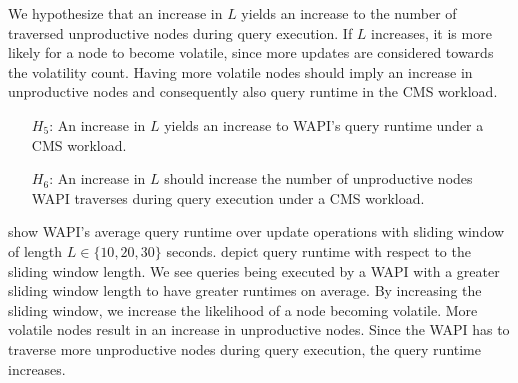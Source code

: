 \documentclass[abstracton,12pt]{scrartcl}
\theoremstyle{definition}
\begin{document}
We hypothesize that an increase in $L$ yields an increase to the number of
traversed unproductive nodes during query execution. If $L$ increases, it is
more likely for a node to become volatile, since more updates are considered
towards the volatility count.
Having more volatile nodes should imply an increase in unproductive nodes and
consequently also query runtime in the CMS workload.

\begin{shaded}
  \begin{itemize}
  \item[$H_5$:] An increase in $L$ yields an increase to WAPI's query runtime
    under a CMS workload. 
  \item[$H_6$:] An increase in $L$ should increase the number of unproductive
    nodes WAPI traverses during query execution under a CMS workload.
  \end{itemize}
\end{shaded}


 show WAPI's average
query runtime over update operations with sliding window of length $L \in \{10, 20,
30\}$ seconds.
 depict query
runtime with respect to the sliding window length. 
We see queries being executed by a WAPI with a greater sliding
window length to have greater runtimes on average. By increasing the sliding
window, we increase the likelihood of a node becoming volatile. More volatile
nodes result in an increase in unproductive nodes. Since the WAPI has to traverse
more unproductive nodes during query execution, the query runtime increases.
\end{document}
